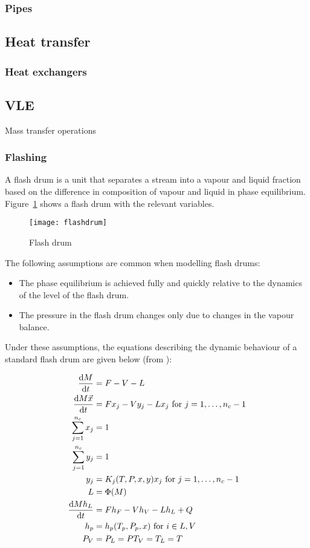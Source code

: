 \subsubsection{Pipes}


\subsection{Heat transfer}
\subsubsection{Heat exchangers}


\subsection{VLE}
Mass transfer operations 



\subsubsection{Flashing}
A flash drum is a unit that separates a stream into a vapour and
liquid fraction based on the difference in composition of vapour and
liquid in phase equilibrium.  Figure~\ref{fig:flashdrum} shows a flash
drum with the relevant variables.

\begin{figure}[htbp]
  \centering
  \texttt{[image: flashdrum]}
  \caption{Flash drum}
  \label{fig:flashdrum}
\end{figure}

The following assumptions are common when modelling flash drums:

\begin{itemize}
\item The phase equilibrium is achieved fully and quickly relative to
  the dynamics of the level of the flash drum.
\item The pressure in the flash drum changes only due to changes in
  the vapour balance.
\end{itemize}

Under these assumptions, the equations describing the dynamic
behaviour of a standard flash drum are given below (from \citet{eich-soellner_stationary_1997}):

\begin{align}
  \frac{\mathrm{d}M}{\mathrm{d}t} &= F - V - L \\
  \frac{\mathrm{d}M\vec{x}}{\mathrm{d}t} &= Fx_j - Vy_j - Lx_j \text{ for } j = 1,\dots,n_c-1  \\
  \sum_{j=1}^{n_c} x_j &= 1 \\
  \sum_{j=1}^{n_c} y_j &= 1 \\
  y_j &= K_j(T, P, x, y)x_j \text{ for } j = 1,\dots,n_c-1  \\
  L &= \Phi(M) \\
  \frac{\mathrm{d}Mh_L}{\mathrm{d}t} &= Fh_F - Vh_V - Lh_L + Q \\
  h_p &= h_p(T_p, P_p, x) \text{ for } i \in {L, V} \\
  P_V &= P_L = P
  T_V=T_L=T
\end{align}

